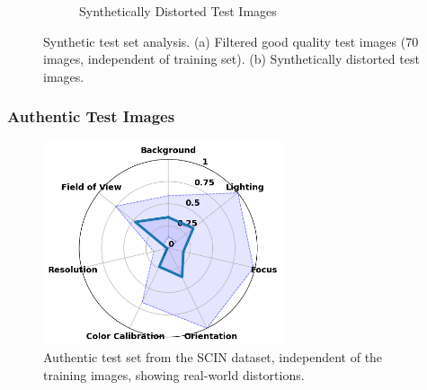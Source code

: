 \begin{figure}[ht]
\begin{subfigure}[b]{0.48\textwidth}
        \caption{Synthetically Distorted Test Images}
        \label{fig:test_70_synthetic}
    \end{subfigure}
    \hfill
    \caption{Synthetic test set analysis. (a) Filtered good quality test images (70 images, independent of training set). (b) Synthetically distorted test images.}
    \label{fig:T1}
\end{figure}

\subsubsection{Authentic Test Images}
\label{subsubsec:AuthenticTestImages}
\begin{figure}[ht]
    \centering
    \includegraphics[keepaspectratio,width=7cm]{img/hept/test_200.png}
    \caption{Authentic test set from the SCIN dataset, independent of the training images, showing real-world distortions.}
    \label{fig:T2}
\end{figure}